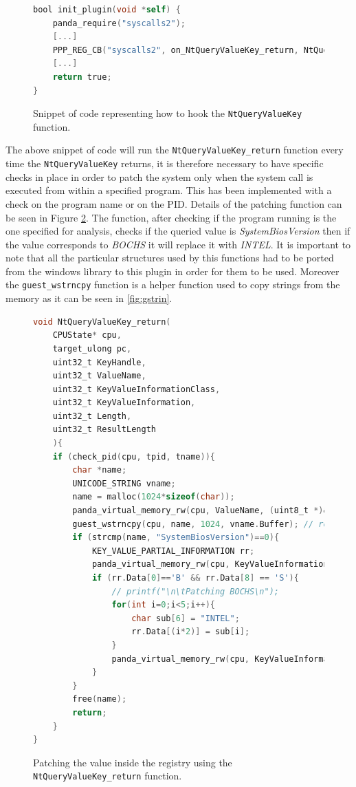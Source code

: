 \begin{figure}[htp]
\centering
\begin{lstlisting}[language=C]
bool init_plugin(void *self) {
    panda_require("syscalls2");
    [...]
    PPP_REG_CB("syscalls2", on_NtQueryValueKey_return, NtQueryValueKey_return);
    [...]
    return true;
}
\end{lstlisting}
\caption{Snippet of code representing how to hook the \lstinline{NtQueryValueKey} function.}
\label{fig:pinit}
\end{figure} 

The above snippet of code will run the \lstinline{NtQueryValueKey_return} function every time the \lstinline{NtQueryValueKey} returns, it is therefore necessary to have specific checks in place in order to patch the system only when the system call is executed from within a specified program. This has been implemented with a check on the program name or on the PID. Details of the patching function can be seen in Figure \ref{fig:pfun}. The function, after checking if the program running is the one specified for analysis, checks if the queried value is \textit{SystemBiosVersion} then if the value corresponds to \textit{BOCHS} it will replace it with \textit{INTEL}. It is important to note that all the particular structures used by this functions had to be ported from the windows library to this plugin in order for them to be used. Moreover the \lstinline{guest_wstrncpy} function is a helper function used to copy strings from the memory as it can be seen in \ref{fig:gstrin}.

\begin{figure}[htp]
\centering
\begin{lstlisting}[language=C]
void NtQueryValueKey_return(
    CPUState* cpu,
    target_ulong pc,
    uint32_t KeyHandle,
    uint32_t ValueName, 
    uint32_t KeyValueInformationClass,
    uint32_t KeyValueInformation,
    uint32_t Length, 
    uint32_t ResultLength 
    ){ 
    if (check_pid(cpu, tpid, tname)){
        char *name;
        UNICODE_STRING vname;
        name = malloc(1024*sizeof(char));
        panda_virtual_memory_rw(cpu, ValueName, (uint8_t *)&vname, sizeof(UNICODE_STRING), 0); // extract the pointer to string
        guest_wstrncpy(cpu, name, 1024, vname.Buffer); // read the string
        if (strcmp(name, "SystemBiosVersion")==0){
            KEY_VALUE_PARTIAL_INFORMATION rr;
            panda_virtual_memory_rw(cpu, KeyValueInformation, (uint8_t *)&rr, Length, 0);
            if (rr.Data[0]=='B' && rr.Data[8] == 'S'){
                // printf("\n\tPatching BOCHS\n");
                for(int i=0;i<5;i++){
                    char sub[6] = "INTEL";
                    rr.Data[(i*2)] = sub[i];
                }
                panda_virtual_memory_rw(cpu, KeyValueInformation, (uint8_t *)&rr, Length, 1);    
            }
        }
        free(name);
        return;
    }
}
\end{lstlisting}
\caption{Patching the value inside the registry using the \lstinline{NtQueryValueKey_return} function.}
\label{fig:pfun}
\end{figure} 

